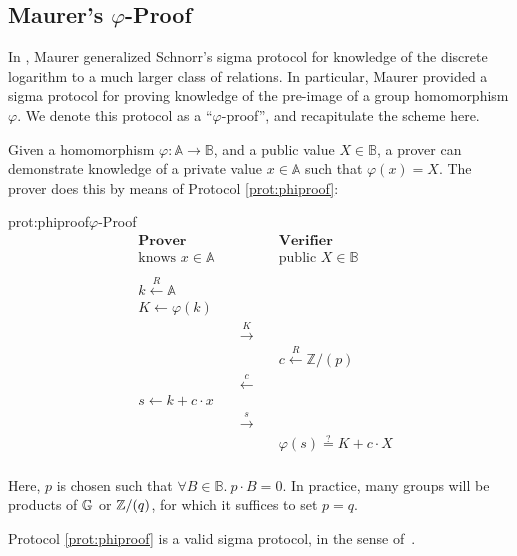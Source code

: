 \subsection{Maurer's \texorpdfstring{$\varphi$}{varphi}-Proof}
\label{sec:maurer}

In \cite{maurer_unifying_2009}, Maurer generalized Schnorr's sigma 
protocol for knowledge of the discrete logarithm \cite{schnorr_efficient_1990} to a much larger class
of relations. In particular, Maurer provided a sigma protocol for
proving knowledge of the pre-image of a group homomorphism $\varphi$.
We denote this protocol as a ``$\varphi$-proof'', and recapitulate the scheme
here.

Given a homomorphism $\varphi : \mathbb{A} \to \mathbb{B}$, and a public value
$X \in \mathbb{B}$, a prover can demonstrate knowledge of a private
value $x \in \mathbb{A}$ such that $\varphi(x) = X$. The prover
does this by means of Protocol \ref{prot:phiproof}:

\begin{aprotocol}{prot:phiproof}{$\varphi$-Proof}
\[
\begin{aligned}
    &\textbf{Prover}&&\textbf{Verifier}\\
    &\text{knows } x \in \mathbb{A}&&\text{public } X \in \mathbb{B}\\
    \\
    &k \xleftarrow{R} \mathbb{A}&\\
    &K \gets \varphi(k)&\\
    &&\quad\overset{K}{\longrightarrow}\quad\\
    &&&c \xleftarrow{R} \mathbb{Z}/(p)\\
    &&\quad\overset{c}{\longleftarrow}\quad\\
    &s \gets k + c \cdot x\\
    &&\quad\overset{s}{\longrightarrow}\quad\\
    &&& \varphi(s) \overset{?}{=} K + c \cdot X\\
\end{aligned}
\]
\end{aprotocol}

Here, $p$ is chosen such that $\forall B \in \mathbb{B}.\ p \cdot B = 0$.
In practice, many groups will be products of $\mathbb{G}$ or $\mathbb{Z}/(q)$,
for which it suffices to set $p = q$.

\begin{claim}
    Protocol \ref{prot:phiproof} is a valid sigma protocol,
    in the sense of~\cite{damgard_sigma-protocols_2002}.
\end{claim}


